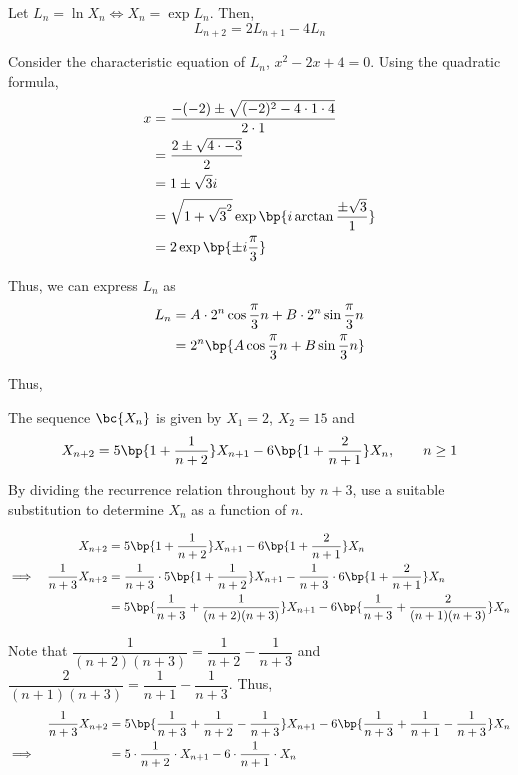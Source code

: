 \documentclass{echw}
\begin{document}
        Let $L_n = \ln X_n \iff X_n = \exp{L_n}$. Then,
        \[
            L_{n+2} = 2L_{n+1} - 4L_n
        \]

        Consider the characteristic equation of $L_n$, $x^2 - 2x + 4 = 0$. Using the quadratic formula,
        \begin{align*}
            x &= \dfrac{-(-2) \pm \sqrt{(-2)^2 - 4\cdot1\cdot4}}{2\cdot1}\\
            &= \dfrac{2 \pm \sqrt{4 \cdot -3}}{2}\\
            &= 1 \pm \sqrt{3}i\\
            &= \sqrt{1 + \sqrt{3}^2} \exp{\bp{i \arctan{\dfrac{\pm{\sqrt3}}1}}}\\
            &= 2 \exp \bp{\pm i \dfrac{\pi}3}
        \end{align*}

        Thus, we can express $L_n$ as
        \begin{align*}
            L_n &= A \cdot 2^n \cos{\dfrac{\pi}3 n} + B \cdot 2^n \sin{\dfrac{\pi}3 n}\\
            &= 2^n \bp{A \cos{\dfrac{\pi}3 n} + B \sin{\dfrac{\pi}3 n}}
        \end{align*}

        Thus,

    \problem{}
        The sequence $\bc{X_n}$ is given by $X_1 = 2$, $X_2 = 15$ and
        \[
            X_{n+2} = 5\bp{1 + \dfrac1{n+2}}X_{n+1} - 6\bp{1 + \dfrac2{n+1}}X_n, \qquad n \geq 1
        \]

         By dividing the recurrence relation throughout by $n+3$, use a suitable substitution to determine $X_n$ as a function of $n$.

    \solution
        \begin{alignat*}{2}
            &&X_{n+2} &= 5\bp{1 + \dfrac1{n+2}}X_{n+1} - 6\bp{1 + \dfrac2{n+1}}X_n\\
            \implies&&\dfrac1{n+3}X_{n+2} &= \dfrac1{n+3} \cdot 5\bp{1 + \dfrac1{n+2}}X_{n+1} - \dfrac1{n+3} \cdot 6\bp{1 + \dfrac2{n+1}}X_n\\
            && &= 5\bp{\dfrac1{n+3} + \dfrac1{(n+2)(n+3)}}X_{n+1} - 6\bp{\dfrac1{n+3} + \dfrac2{(n+1)(n+3)}}X_n
        \end{alignat*}

        Note that $\dfrac1{(n+2)(n+3)} = \dfrac1{n+2} - \dfrac1{n+3}$ and $\dfrac{2}{(n+1)(n+3)} = \dfrac1{n+1} - \dfrac1{n+3}$. Thus,
        \begin{alignat*}{2}
            &&\dfrac1{n+3}X_{n+2} &= 5\bp{\dfrac1{n+3} + \dfrac1{n+2} - \dfrac1{n+3}}X_{n+1} - 6\bp{\dfrac1{n+3} + \dfrac1{n+1} - \dfrac1{n+3}}X_n\\
            \implies&& &= 5\cdot \dfrac1{n+2} \cdot X_{n+1} - 6\cdot \dfrac1{n+1} \cdot X_n
        \end{alignat*}
\end{document}
